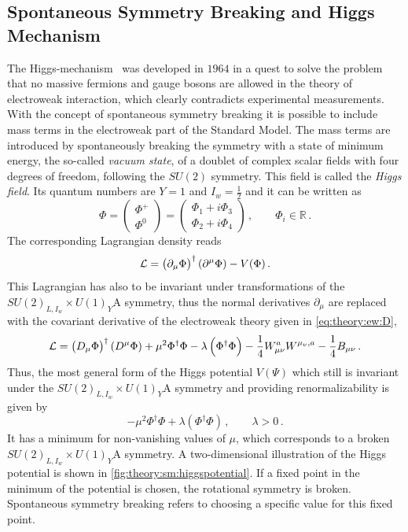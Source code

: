 \subsection{Spontaneous Symmetry Breaking and Higgs Mechanism}\label{sub:theory:sm:higgsmechanism}

The Higgs-mechanism~\cite{HiggsMecha1,HiggsMecha2,HiggsMecha3,HiggsMecha4,HiggsMecha5,HiggsMecha6} was
developed in $1964$ in a quest to solve the problem that no massive fermions and gauge bosons are allowed
in the theory of electroweak interaction, which clearly contradicts experimental measurements.
With the concept of spontaneous symmetry breaking it is possible to include mass terms in the electroweak part of the Standard Model.
The mass terms are introduced by spontaneously breaking the symmetry with a state of minimum energy, the so-called \emph{vacuum state},
of a doublet of complex scalar fields with four degrees of freedom, following the $SU(2)$ symmetry.
This field is called the \emph{Higgs field}.
Its quantum numbers are $Y = 1$ and $I_w = \frac{1}{2}$ and it can be written as~\cite{Schmuser}
\begin{equation}
    \Phi =
    \begin{pmatrix}
        \Phi^+ \\ \Phi^0
    \end{pmatrix}
    =
    \begin{pmatrix}
        \Phi_1 + i \Phi_3 \\
        \Phi_2 + i \Phi_4
    \end{pmatrix} \,, \qquad \Phi_i \in \mathbb{R} \,.
\end{equation}
The corresponding Lagrangian density reads
\begin{equation}
    \mathcal{L} = {\left(\partial_\mu\Phi\right)}^\dagger \left(\partial^\mu\Phi\right) - V(\Phi) \,.
\end{equation}
This Lagrangian has also to be invariant under transformations of the $SU{(2)}_{L,I_w} \times U{(1)}_Y$A symmetry,
thus the normal derivatives $\partial_\mu$ are replaced with the covariant derivative of the electroweak theory given in \cref{eq:theory:ew:D},
\begin{equation}
    \mathcal{L} = {\left(D_\mu\Phi\right)}^\dagger \left(D^\mu\Phi\right) + \mu^2 \Phi^\dagger \Phi - \lambda \left(\Phi^\dagger \Phi\right) - \frac{1}{4} W_{\mu\nu}^a W^{\mu_\nu,a} - \frac{1}{4} B_{\mu\nu} \,.
\end{equation}
Thus, the most general form of the Higgs potential $V(\Psi)$ which still is invariant under the $SU{(2)}_{L,I_w} \times U{(1)}_Y$A symmetry and providing renormalizability
is given by
\begin{equation}
    - \mu^2 \Phi^\dagger \Phi + \lambda \left(\Phi^\dagger \Phi\right) \,, \qquad \lambda > 0 \,.
\end{equation}
It has a minimum for non-vanishing values of $\mu$, which corresponds to a broken $SU{(2)}_{L,I_w} \times U{(1)}_Y$A symmetry.
A two-dimensional illustration of the Higgs potential is shown in \cref{fig:theory:sm:higgspotential}.
If a fixed point in the minimum of the potential is chosen, the rotational symmetry is broken.
Spontaneous symmetry breaking refers to choosing a specific value for this fixed point.

